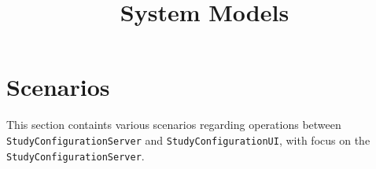 \documentclass{article}
\title{System Models}
\begin{document}
\maketitle

%
%
\newcommand{\researcher}{\texttt{Researcher}\xspace}
\newcommand{\clientside}{\texttt{StudyConfigurationUI}\xspace}
\newcommand{\invalidUser}{\texttt{InvalidUser}\xspace}
\newcommand{\serverside}{\texttt{StudyConfigurationServer}\xspace}
\newcommand{\incident}{\texttt{Incident}\xspace}
\newcommand{\reportemergency}{\texttt{ReportEmergency}\xspace}
\newcommand{\openincident}{\texttt{OpenIncident}\xspace}

\section{Scenarios}
This section containts various scenarios regarding operations between \serverside and \clientside, with focus on the \serverside.
\end{document}
